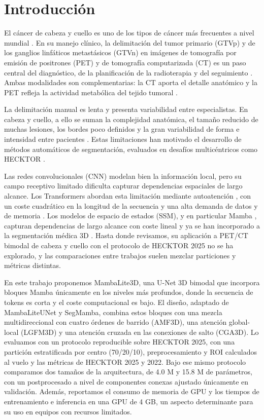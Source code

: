 \documentclass[conference]{IEEEtran}
\begin{document}
\section{Introducción}
El cáncer de cabeza y cuello es uno de los tipos de cáncer más frecuentes a nivel mundial \cite{Li_2023}. %
En su manejo clínico, la delimitación del tumor primario (GTVp) y de los ganglios linfáticos metastásicos (GTVn) en imágenes de tomografía por emisión de positrones (PET) y de tomografía computarizada (CT) es un paso central del diagnóstico, de la planificación de la radioterapia y del seguimiento \cite{isa_net2023}. Ambas modalidades son complementarias: la CT aporta el detalle anatómico y la PET refleja la actividad metabólica del tejido tumoral \cite{SegmentationHeadNeckDualPETCT2025}.

La delimitación manual es lenta y presenta variabilidad entre especialistas. En cabeza y cuello, a ello se suman la complejidad anatómica, el tamaño reducido de muchas lesiones, los bordes poco definidos y la gran variabilidad de forma e intensidad entre pacientes \cite{Chu2023114}. Estas limitaciones han motivado el desarrollo de métodos automáticos de segmentación, evaluados en desafíos multicéntricos como HECKTOR \cite{Oreiller2022,saeed2026hecktor25}.

Las redes convolucionales (CNN) modelan bien la información local, pero su campo receptivo limitado dificulta capturar dependencias espaciales de largo alcance. Los Transformers abordan esta limitación mediante autoatención \cite{vaswani2023attentionneed,dosovitskiy2021imageworth16x16words}, con un coste cuadrático en la longitud de la secuencia y una alta demanda de datos y de memoria \cite{ANDRADEMIRANDA2023102308}. Los modelos de espacio de estados (SSM), y en particular Mamba \cite{gu2023mamba}, capturan dependencias de largo alcance con coste lineal y ya se han incorporado a la segmentación médica 3D \cite{ma2024umamba,xing2024segmamba}. Hasta donde revisamos, su aplicación a PET/CT bimodal de cabeza y cuello con el protocolo de HECKTOR 2025 no se ha explorado, y las comparaciones entre trabajos suelen mezclar particiones y métricas distintas.

En este trabajo proponemos MambaLite3D, una U-Net 3D bimodal que incorpora bloques Mamba únicamente en los niveles más profundos, donde la secuencia de tokens es corta y el coste computacional es bajo. El diseño, adaptado de MambaLiteUNet y SegMamba, combina estos bloques con una mezcla multidireccional con cuatro órdenes de barrido (AMF3D), una atención global-local (LGFM3D) y una atención cruzada en las conexiones de salto (CGA3D). Lo evaluamos con un protocolo reproducible sobre HECKTOR 2025, con una partición estratificada por centro (70/20/10), preprocesamiento y ROI calculados al vuelo y las métricas de HECKTOR 2025 y 2022. Bajo ese mismo protocolo comparamos dos tamaños de la arquitectura, de 4.0 M y 15.8 M de parámetros, con un postprocesado a nivel de componentes conexas ajustado únicamente en validación. Además, reportamos el consumo de memoria de GPU y los tiempos de entrenamiento e inferencia en una GPU de 4 GB, un aspecto determinante para su uso en equipos con recursos limitados.
\end{document}
